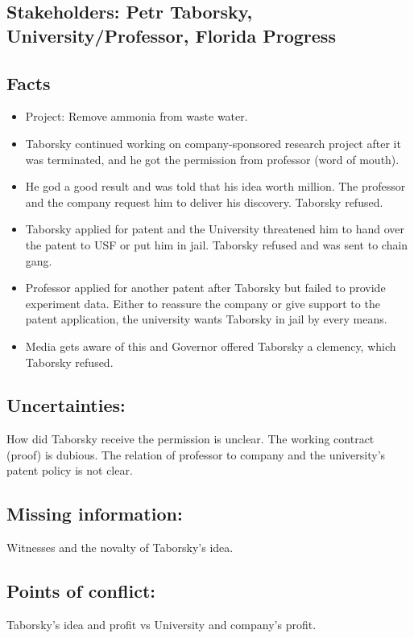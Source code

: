 \documentclass[draft,11pt,openright,monochrome,british,a4paper]{scrartcl}
\begin{document}
\subsection*{Stakeholders: Petr Taborsky, University/Professor, Florida Progress}

\subsection*{Facts}


\begin{itemize}
\item   Project: Remove ammonia from waste water.
\item	Taborsky continued working on company-sponsored research project after it was terminated, and he got the permission from professor (word of mouth).
\item	He god a good result and was told that his idea worth million. The professor and the company request him to deliver his discovery. Taborsky refused.
\item	Taborsky applied for patent and the University threatened him to hand over the patent to USF or put him in jail. Taborsky refused and was sent to chain gang.
\item	Professor applied for another patent after Taborsky but failed to provide experiment data. Either to reassure the company or give support to the patent application, the university wants Taborsky in jail by every means.
\item	Media gets aware of this and Governor offered Taborsky a clemency, which Taborsky refused.

 \end{itemize}
 
\subsection*{Uncertainties:}
How did Taborsky receive the permission is unclear. The working contract (proof) is dubious. The relation of professor to company and the university's patent policy is not clear.

\subsection*{Missing information:}
Witnesses and the novalty of Taborsky's idea.

\subsection*{Points of conflict:}
Taborsky's idea and profit vs University and company's profit.
\end{document}
